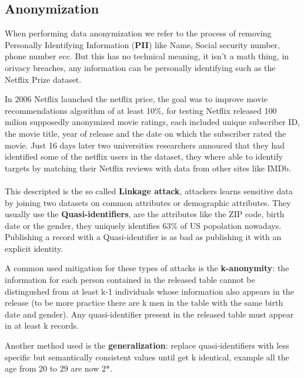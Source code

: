 \subsection{Anonymization}
When performing data anonymization we refer to the process of removing Personally Identifying Information (\textbf{PII}) like Name, Social security number, phone number ecc. But this has no technical meaning, it isn't a math thing, in orivacy breaches, any information can be personally identifying such as the Netflix Prize dataset.

In 2006 Netflix launched the netflix price, the goal was to improve movie recommendations algorithm of at least 10\%, for testing Netflix released 100 milion supposedly anonymized movie ratings, each included unique subscriber ID, the movie title, year of release and the date on which the subscriber rated the movie. Just 16 days later two universities researchers annouced that they had identified some of the netflix users in the dataset, they where able to identify targets by matching their Netflix reviews with data from other sites like IMDb.
\\\\
This descripted is the so called \textbf{Linkage attack}, attackers learns sensitive data by joining two datasets on common attributes or demographic attributes. They usually use the \textbf{Quasi-identifiers}, are the attributes like the ZIP code, birth date or the gender, they uniquely identifies 63\% of US popolation nowadays. Publishing a record with a Quasi-identifier is as bad as publishing it with an explicit identity.

A common used mitigation for these types of attacks is the \textbf{k-anonymity}: the information for each person contained in the released table cannot be distingushed from at least k-1 individuals whose information also appears in the release (to be more practice there are k men in the table with the same birth date and gender). Any quasi-identifier present in the released table must appear in at least k records.

Another method used is the \textbf{generalization}: replace quasi-identifiers with less specific but semantically consistent values until get k identical, example all the age from 20 to 29 are now 2*.

